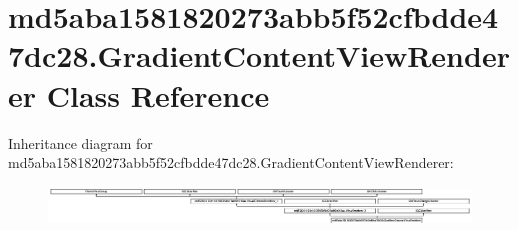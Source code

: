 \hypertarget{classmd5aba1581820273abb5f52cfbdde47dc28_1_1GradientContentViewRenderer}{}\section{md5aba1581820273abb5f52cfbdde47dc28.\+Gradient\+Content\+View\+Renderer Class Reference}
\label{classmd5aba1581820273abb5f52cfbdde47dc28_1_1GradientContentViewRenderer}
Inheritance diagram for md5aba1581820273abb5f52cfbdde47dc28.\+Gradient\+Content\+View\+Renderer\+:\begin{figure}[H]
\begin{center}
\leavevmode
\includegraphics[height=1.025172cm]{classmd5aba1581820273abb5f52cfbdde47dc28_1_1GradientContentViewRenderer}
\end{center}
\end{figure}
